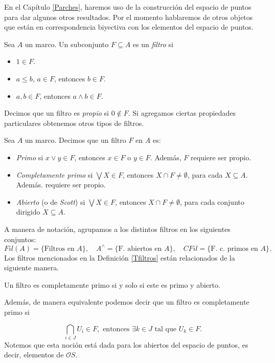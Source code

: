 En el Capítulo \ref{Parches}, haremos uso de la construcción del espacio de puntos para dar algunos otros resultados. Por el momento hablaremos de otros objetos que están en correspondencia biyectiva con los 
elementos del espacio de puntos.

\begin{dfn}\label{Filtro}
    Sea $A$ un marco. Un subconjunto $F\subseteq A$ es un \emph{filtro} si
    \begin{itemize}
        \item $1\in F$.
        \item $a\leq b$, $a\in F$, entonces $b\in F$.
        \item $a, b\in F$, entonces $a\wedge b\in F$.
    \end{itemize}
\end{dfn}
Decimos que un filtro es \emph{propio} si $0\notin F$. Si agregamos ciertas propiedades particulares obtenemos otros tipos de filtros.

\begin{dfn}\label{Tfiltros}
    Sea $A$ un marco. Decimos que un filtro $F$ en $A$ es:
    \begin{itemize}
        \item \emph{Primo} si $x\vee y\in F$, entonces $x\in F$ o $y\in F$. Además, $F$ requiere ser propio.
        \item \emph{Completamente primo} si $\bigvee X\in F$, entonces $X\cap F\neq \emptyset$, para cada $X\subseteq A$. Además. requiere ser propio.
        \item \emph{Abierto} (o de \emph{Scott}) si $\bigvee X\in F$, entonces $X\cap F\neq \emptyset$, para cada  conjunto dirigido $X\subseteq A$.
    \end{itemize}
\end{dfn}

A manera de notación, agrupamos a los distintos filtros en los siguientes conjuntos:
\[
Fil(A)=\{\mbox{Filtros en $A$}\}, \quad A^\wedge=\{\mbox{F. abiertos en $A$}\}, \quad CFil=\{\mbox{F. c. primos en $A$}\}.
\]
Los filtros mencionados en la Definición \ref{Tfiltros} están relacionados de la siguiente manera. 

\begin{prop}
    Un filtro es completamente primo si y solo si este es primo y abierto.
\end{prop}

Además, de manera equivalente podemos decir que un filtro es completamente primo si

\[
\bigcap_{i\in J} U_i\in F, \mbox{ entonces } \exists k\in J \mbox{ tal que }U_k\in F.
\]
Notemos que esta noción está dada para los abiertos del espacio de puntos, es decir, elementos de $\mathcal{O}S$.\\

